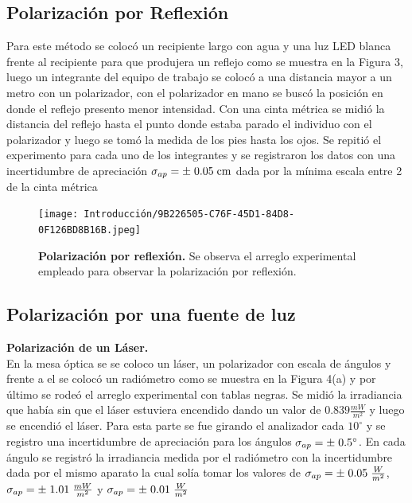 \documentclass[DIV=calc, paper=a4, fontsize=10pt]{scrartcl}
\begin{document}
\subsection*{\textcolor{carmine}{Polarización por Reflexión}}
Para este método se colocó un recipiente largo con agua y una luz LED blanca frente al recipiente para que produjera un reflejo como se muestra en la Figura 3, luego un integrante del equipo de trabajo se colocó a una distancia mayor a un metro con un polarizador, con el polarizador en mano se buscó la posición en donde el reflejo presento menor intensidad. Con una cinta métrica se midió la distancia del reflejo hasta el punto donde estaba parado el individuo con el polarizador y luego se tomó la medida de los pies hasta los ojos. Se repitió el experimento para cada uno de los integrantes y se registraron los datos con una incertidumbre de apreciación $\sigma_{ap}=\pm\hspace{0.1cm}0.05\hspace{0.1cm}\text{cm}$ dada por la mínima escala entre 2 de la cinta métrica 
\begin{figure}[H]
    \centering
    \texttt{[image: Introducción/9B226505-C76F-45D1-84D8-0F126BD8B16B.jpeg]}
    \caption{\textbf{Polarización por reflexión.} Se observa el arreglo experimental empleado para observar la polarización por reflexión.}
    \label{fig:my_label}
\end{figure}
\subsection*{\textcolor{carmine}{Polarización por una fuente de luz}}

\textcolor{carmine}{\textbf{Polarización de un Láser.}}\\
En la mesa óptica se se coloco un láser, un polarizador con escala de ángulos y frente a el se colocó un radiómetro como se muestra en la Figura 4(a) y por último se rodeó el arreglo experimental con tablas negras. Se midió la irradiancia que había sin que el láser estuviera encendido dando un valor de $0.839\frac{mW}{m^2}$ y luego se encendió el láser. Para esta parte se fue girando el analizador cada $10^{\circ}$ y se registro una incertidumbre de apreciación para los ángulos $\sigma_{ap}=\pm\hspace{0.1cm}0.5^{\circ}$. En cada ángulo se registró la irradiancia medida por el radiómetro con la incertidumbre dada por el mismo aparato la cual solía tomar los valores de  $\sigma_{ap}=\pm\hspace{0.1cm}0.05\hspace{0.1cm}\frac{W}{m^{2}}$, $\sigma_{ap}=\pm\hspace{0.1cm}1.01\hspace{0.1cm}\frac{mW}{m^{2}}$  y 
$\sigma_{ap}=\pm\hspace{0.1cm}0.01\hspace{0.1cm}\frac{W}{m^{2}}$\\
\end{document}
